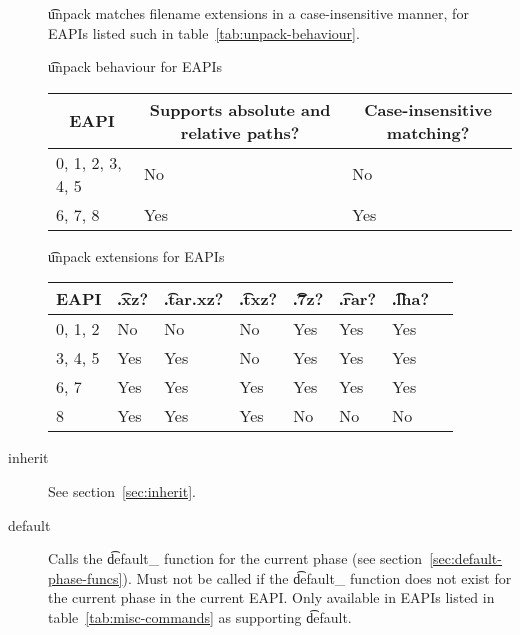 \begin{description}
     \t{unpack} matches filename extensions in a case-insensitive
    manner, for EAPIs listed such in table~\ref{tab:unpack-behaviour}.

    \begin{centertable}{\t{unpack} behaviour for EAPIs}
        \label{tab:unpack-behaviour}
        \begin{tabular}{lll}
          \toprule
          \multicolumn{1}{c}{\textbf{EAPI}} &
          \multicolumn{1}{c}{\textbf{Supports absolute and relative paths?}} &
          \multicolumn{1}{c}{\textbf{Case-insensitive matching?}} \\
          \midrule
          0, 1, 2, 3, 4, 5  & No  & No  \\
          6, 7, 8           & Yes & Yes \\
          \bottomrule
        \end{tabular}
    \end{centertable}

    \begin{centertable}{\t{unpack} extensions for EAPIs}
        \label{tab:unpack-extensions-table}
        \begin{tabular}{llllllll}
          \toprule
          \multicolumn{1}{c}{\textbf{EAPI}} &
          \multicolumn{1}{c}{\textbf{\t{.xz}?}} &
          \multicolumn{1}{c}{\textbf{\t{.tar.xz}?}} &
          \multicolumn{1}{c}{\textbf{\t{.txz}?}} &
          \multicolumn{1}{c}{\textbf{\t{.7z}?}} &
          \multicolumn{1}{c}{\textbf{\t{.rar}?}} &
          \multicolumn{1}{c}{\textbf{\t{.lha}?}} \\
          \midrule
          0, 1, 2           & No  & No  & No  & Yes & Yes & Yes \\
          3, 4, 5           & Yes & Yes & No  & Yes & Yes & Yes \\
          6, 7              & Yes & Yes & Yes & Yes & Yes & Yes \\
          8                 & Yes & Yes & Yes & No  & No  & No  \\
          \bottomrule
        \end{tabular}
    \end{centertable}

\item[inherit] See section~\ref{sec:inherit}.

\item[default]
     Calls the \t{default_} function for the current phase (see
    section~\ref{sec:default-phase-funcs}). Must not be called if the \t{default_} function does
    not exist for the current phase in the current EAPI\@. Only available in EAPIs listed in
    table~\ref{tab:misc-commands} as supporting \t{default}.


\end{description}
